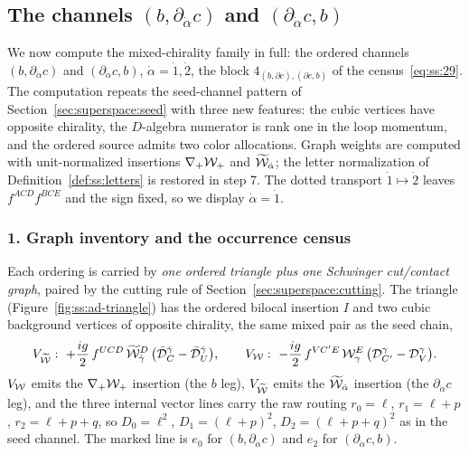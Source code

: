 \subsection{The channels $(b,\partial_{\dot\alpha}c)$ and $(\partial_{\dot\alpha}c,b)$}\label{sec:superspace:ad}

We now compute the mixed-chirality family in full: the ordered channels
$(b,\partial_{\dot\alpha}c)$ and $(\partial_{\dot\alpha}c,b)$,
$\dot\alpha=\dot1,\dot2$, the block $4_{(b,\partial c),(\partial c,b)}$ of the
census~\eqref{eq:ss:29}. The computation repeats the seed-channel pattern of
Section~\ref{sec:superspace:seed} with three new features: the cubic vertices
have opposite chirality, the $D$-algebra numerator is rank one in the loop
momentum, and the ordered source admits two color allocations. Graph weights
are computed with unit-normalized insertions $\nabla_{+}\mathcal{W}_{+}$ and
$\widetilde{\mathcal{W}}_{\dot\alpha}$; the letter normalization of
Definition~\ref{def:ss:letters} is restored in step 7. The dotted transport
$\dot1\mapsto\dot2$ leaves $f^{ACD}f^{BCE}$ and the sign fixed, so we display
$\dot\alpha=\dot1$.

\subsubsection*{1. Graph inventory and the occurrence census}

Each ordering is carried by \emph{one ordered triangle plus one Schwinger
cut/contact graph}, paired by the cutting rule of
Section~\ref{sec:superspace:cutting}. The triangle
(Figure~\ref{fig:ss:ad-triangle}) has the ordered bilocal insertion $I$ and two
cubic background vertices of opposite chirality, the same mixed pair as the
seed chain,
\begin{equation}\label{eq:ss:ad-vertices}
V_{\widetilde{\mathcal{W}}}:\ +\frac{ig}{2}\,f^{UCD}\,
\widetilde{\mathcal{W}}^{D}_{\dot\gamma}\,\big(\bar{\mathcal{D}}_{C}^{\dot\gamma}-\bar{\mathcal{D}}_{U}^{\dot\gamma}\big),
\qquad
V_{\mathcal{W}}:\ -\frac{ig}{2}\,f^{VC'E}\,
\mathcal{W}^{E}_{\gamma}\,\big(\mathcal{D}_{C'}^{\gamma}-\mathcal{D}_{V}^{\gamma}\big).
\end{equation}
$V_{\mathcal{W}}$ emits the $\nabla_{+}\mathcal{W}_{+}$ insertion (the $b$ leg),
$V_{\widetilde{\mathcal{W}}}$ emits the $\widetilde{\mathcal{W}}_{\dot\alpha}$ insertion (the
$\partial_{\dot\alpha}c$ leg), and the three internal vector lines carry the
raw routing $r_{0}=\ell$, $r_{1}=\ell+p$, $r_{2}=\ell+p+q$, so
$D_{0}=\ell^{2}$, $D_{1}=(\ell+p)^{2}$, $D_{2}=(\ell+p+q)^{2}$ as in the seed
channel. The marked line is $e_{0}$ for $(b,\partial_{\dot\alpha}c)$ and
$e_{2}$ for $(\partial_{\dot\alpha}c,b)$.

